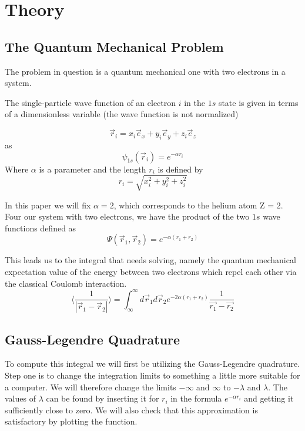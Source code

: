 \documentclass[../main.tex]{subfiles}
\begin{document}
\section{Theory} \label{sec:theory}
\subsection{The Quantum Mechanical Problem} \label{sec:QMProb}
The problem in question is a quantum mechanical one with two electrons in a system.

The single-particle wave function of an electron $i$ in the $1s$ state is given in terms of a dimensionless variable (the wave function is not normalized)

\[\vec{r}_i = x_i \vec{e}_x + y_i \vec{e}_y + z_i \vec{e}_z\]
as
\[\psi_{1s}(\vec{r}_i) = e^{-\alpha r_i}\]
Where $\alpha$ is a parameter and the length $r_i$ is defined by
\[r_i = \sqrt{x_i^2 + y_i^2 + z_i^2}\]

In this paper we will fix $\alpha = 2$, which corresponds to the helium atom Z = 2.\\

Four our system with two electrons, we have the product of the two $1s$ wave functions defined as
\[\Psi(\vec{r}_1, \vec{r}_2) = e^{-\alpha(r_1 + r_2)}\]

This leads us to the integral that needs solving, namely the quantum mechanical expectation value of the energy between two electrons which repel each other via the classical Coulomb interaction.
\[\langle \frac{1}{|\vec{r}_1 - \vec{r}_2|} \rangle = \int_{\infty}^\infty d\vec{r}_1 d\vec{r}_2 e^{-2\alpha(r_1 + r_2)} \frac{1}{\vec{r_1} - \vec{r_2}}\]



\subsection{Gauss-Legendre Quadrature} \label{sec:GLQ}
To compute this integral we will first be utilizing the Gauss-Legendre quadrature. Step one is to change the integration limits to something a little more suitable for a computer. We will therefore change the limits $-\infty$ and $\infty$ to $-\lambda$ and $\lambda$. The values of $\lambda$ can be found by inserting it for $r_i$ in the formula $e^{-\alpha r_i}$ and getting it sufficiently close to zero.  We will also check that this approximation is satisfactory by plotting the function.
\end{document}
